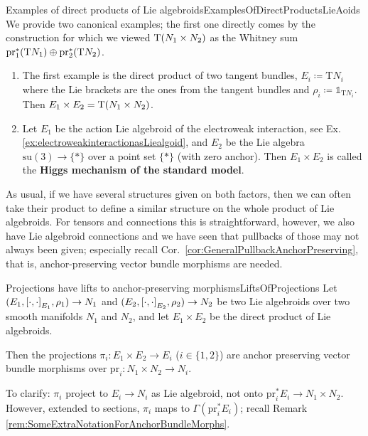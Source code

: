 \begin{examples}{Examples of direct products of Lie algebroids}{ExamplesOfDirectProductsLieAoids}
We provide two canonical examples; the first one directly comes by the construction for which we viewed $\mathrm{T}\mleft( N_1 \times N_2 \mright)$ as the Whitney sum $\mathrm{pr}_1^*\mleft( \mathrm{T}N_1 \mright) \oplus \mathrm{pr}_2^*\mleft( \mathrm{T}N_2 \mright)$.
\begin{enumerate}
	\item The first example is the direct product of two tangent bundles, $E_i \coloneqq \mathrm{T}N_i$ where the Lie brackets are the ones from the tangent bundles and $\rho_i \coloneqq \mathds{1}_{\mathrm{T}N_i}$. Then $E_1 \times E_2 = \mathrm{T}\mleft( N_1 \times N_2 \mright)$.
	\item Let $E_1$ be the action Lie algebroid of the electroweak interaction, see Ex. \ref{ex:electroweakinteractionasLiealgoid}, and $E_2$ be the Lie algebra $\mathrm{su}(3) \to \{*\}$ over a point set $\{*\}$ (with zero anchor). Then $E_1 \times E_2$ is called the \textbf{Higgs mechanism of the standard model}.
\end{enumerate}
\end{examples}

As usual, if we have several structures given on both factors, then we can often take their product to define a similar structure on the whole product of Lie algebroids. For tensors and connections this is straightforward, however, we also have Lie algebroid connections and we have seen that pullbacks of those may not always been given; especially recall Cor.~\ref{cor:GeneralPullbackAnchorPreserving}, that is, anchor-preserving vector bundle morphisms are needed.

\begin{lemmata}{Projections have lifts to anchor-preserving morphisms}{LiftsOfProjections}
Let $(E_1, \mleft[ \cdot, \cdot \mright]_{E_1}, \rho_1) \to N_1$ and $(E_2, \mleft[ \cdot, \cdot \mright]_{E_2}, \rho_2) \to N_2$ be two Lie algebroids over two smooth manifolds $N_1$ and $N_2$, and let $E_1 \times E_2$ be the direct product of Lie algebroids.

Then the projections $\pi_i: E_1 \times E_2 \to E_i$ ($i \in \{1,2\}$) are anchor preserving vector bundle morphisms over $\mathrm{pr}_i: N_1 \times N_2 \to N_i$.
\end{lemmata}

\begin{remark}
\leavevmode\newline
To clarify: $\pi_i$ project to $E_i \to N_i$ as Lie algebroid, not onto $\mathrm{pr}_i^*E_i \to N_1 \times N_2$. However, extended to sections, $\pi_i$ maps to $\Gamma(\mathrm{pr}_i^*E_i)$; recall Remark \ref{rem:SomeExtraNotationForAnchorBundleMorphs}.
\end{remark}

